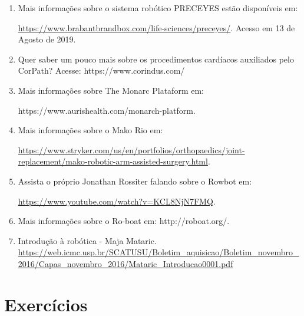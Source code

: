 \begin{enumerate}
    \item Mais informações sobre o sistema robótico PRECEYES estão disponíveis em:

    \url{https://www.brabantbrandbox.com/life-sciences/preceyes/}. Acesso em 13 de Agosto de 2019.
    
    \item Quer saber um pouco mais sobre os procedimentos cardíacos auxiliados pelo CorPath? Acesse: https://www.corindus.com/
    \item Mais informações sobre The Monarc Plataform em:


    https://www.aurishealth.com/monarch-platform.
    \item Mais informações sobre o Mako Rio em:
    
    \url{https://www.stryker.com/us/en/portfolios/orthopaedics/joint-replacement/mako-robotic-arm-assisted-surgery.html}.
    \item Assista o próprio Jonathan Rossiter falando sobre o Rowbot em:
    
    \url{https://www.youtube.com/watch?v=KCL8NjN7FMQ}.
    
    \item Mais informações sobre o Ro-boat em:
    http://roboat.org/.
    \item Introdução à robótica - Maja Mataric. \\
    \url{https://web.icmc.usp.br/SCATUSU/Boletim_aquisicao/Boletim_novembro_2016/Capas_novembro_2016/Mataric_Introducao0001.pdf}
\end{enumerate}

\section{Exercícios}






